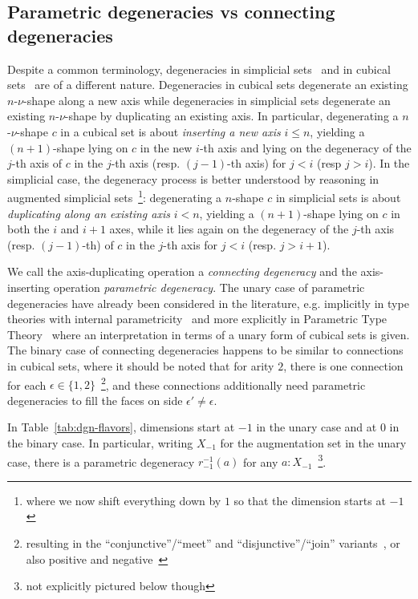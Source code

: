 \documentclass[a4paper,UKenglish,cleveref,autoref]{lipics-v2021}
\begin{document}
\subsection{Parametric degeneracies vs connecting degeneracies}
\label{sec:dgn-flavors}

Despite a common terminology, degeneracies in simplicial sets~\cite{fri08} and in cubical sets~\cite{grandis03} are of a different nature. Degeneracies in cubical sets degenerate an existing $n$-$\nu$-shape along a new axis while degeneracies in simplicial sets degenerate an existing $n$-$\nu$-shape by duplicating an existing axis. In particular, degenerating a $n$-$\nu$-shape $c$ in a cubical set is about \emph{inserting a new axis} $i \leq n$, yielding a $(n+1)$-shape lying on $c$ in the new $i$-th axis and lying on the degeneracy of the $j$-th axis of $c$ in the $j$-th axis (resp. $(j-1)$-th axis) for $j < i$ (resp $j > i$). In the simplicial case, the degeneracy process is better understood by reasoning in augmented simplicial sets~\footnote{where we now shift everything down by $1$ so that the dimension starts at $-1$}: degenerating a $n$-shape $c$ in simplicial sets is about \emph{duplicating along an existing axis} $i < n$, yielding a $(n+1)$-shape lying on $c$ in both the $i$ and $i+1$ axes, while it lies again on the degeneracy of the $j$-th axis (resp. $(j-1)$-th) of $c$ in the $j$-th axis for $j < i$ (resp. $j > i+1$).

We call the axis-duplicating operation a \emph{connecting degeneracy} and the axis-inserting operation \emph{parametric degeneracy}. The unary case of parametric degeneracies have already been considered in the literature, e.g. implicitly in type theories with internal parametricity~\cite{moulin16,bernardy12} and more explicitly in Parametric Type Theory~\cite{bernardy15} where an interpretation in terms of a unary form of cubical sets is given. The binary case of connecting degeneracies happens to be similar to connections in cubical sets, where it should be noted that for arity $2$, there is one connection for each $\epsilon \in \{1,2\}$~\footnote{resulting in the ``conjunctive''/``meet'' and ``disjunctive''/``join'' variants~\cite{grandis03}, or also positive and negative~\cite{BrownHiggins81}}, and these connections additionally need parametric degeneracies to fill the faces on side $\epsilon' \neq \epsilon$.

In Table~\ref{tab:dgn-flavors}, dimensions start at $-1$ in the unary case and at $0$ in the binary case. In particular, writing $X_{-1}$ for the augmentation set in the unary case, there is a parametric degeneracy $r^{-1}_{-1}(a)$ for any $a:X_{-1}$~\footnote{not explicitly pictured below though}.
\end{document}
